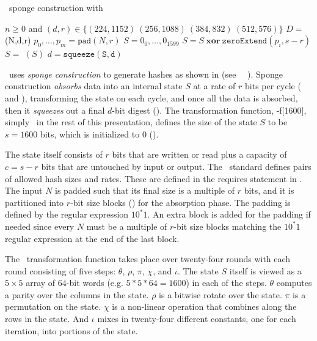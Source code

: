 \begin{algorithm}[t]
  \caption{\shaThree\ sponge construction with \keccak}\label{alg:sha3}
  \begin{algorithmic}[1]
    \Require $n \geq 0$ and $(d,r) \in \{(224, 1152)\ (256, 1088)\ (384, 832)\ (512, 576)\}$
    \Ensure $D =$ \shaThree(N,d,r)
    \State $p_0, \ldots, p_m = \mathtt{pad}(N, r)$\label{line:pad}
    \State $S = 0_0, \ldots, 0_{1599}$\label{line:init}
      \State $S = S\ \mathbf{xor}\ \mathtt{zeroExtend}(p_i, s-r)$\label{line:absorb}
      \State $S =$ \keccak$(S)$\label{line:keccak}
    \EndFor
    \State $d = \mathtt{squeeze(S,d)}$\label{line:squeeze}
  \end{algorithmic}
\end{algorithm}

\shaThree\ uses \emph{sponge construction} to generate hashes as shown in  (see \nist\ \fips\ \cite{fips202}).
Sponge construction \emph{absorbs} data into an internal state $S$ at a rate of $r$ bits per cycle ( and ), transforming the state on each cycle, and once all the data is absorbed, then it \emph{squeezes} out a final $d$-bit digest ().
The transformation function, \keccak-f[1600], simply \keccak\ in the rest of this presentation, defines the size of the state $S$ to be $s = 1600$ bits, which is initialized to 0 ().

The state itself consists of $r$ bits that are written or read plus a capacity of $c = s - r$ bits that are untouched by input or output.
The \nist\ standard defines pairs of allowed hash sizes and rates.
These are defined in the requires statement in . 
The input $N$ is padded such that its final size is a multiple of $r$ bits, and it is partitioned into $r$-bit size blocks () for the absorption phase.
The padding is defined by the regular expression $10^*1$.
An extra block is added for the padding if needed since every $N$ must be a multiple of $r$-bit size blocks matching the $10^*1$ regular expression at the end of the last block.

The \keccak\ transformation function takes place over twenty-four rounds with each round consisting of five steps: $\theta$, $\rho$, $\pi$, $\chi$, and $\iota$. The state $S$ itself is viewed as a $5 \times 5$ array of $64$-bit words (e.g. $5 * 5 * 64 = 1600$) in each of the steps. $\theta$ computes a parity over the columns in the state. $\rho$ is a bitwise rotate over the state. $\pi$ is a permutation on the state. $\chi$ is a non-linear operation that combines along the rows in the state. And $\iota$ mixes in twenty-four different constants, one for each iteration, into portions of the state.

